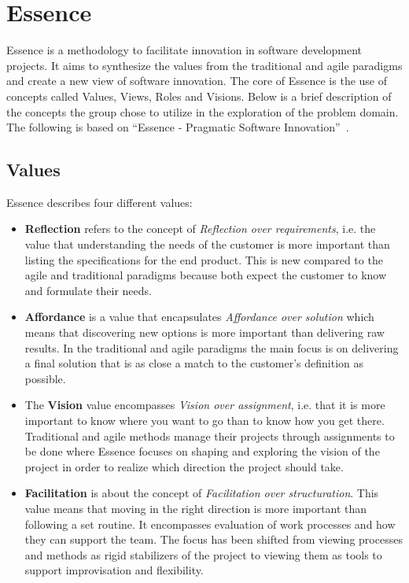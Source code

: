 \section{Essence}
Essence is a methodology to facilitate innovation in software development projects. It aims to synthesize the values from the traditional and agile para\-digms and create a new view of software innovation. The core of Essence is the use of concepts called Values, Views, Roles and Visions. Below is a brief description of the concepts the group chose to utilize in the exploration of the problem domain. The following is based on ``Essence - Pragmatic Software Innovation''~\cite{essence}.

\subsection{Values} 
Essence describes four different values: 
\begin{itemize}
\item \textbf{Reflection} refers to the concept of \textit{Reflection over requirements}, i.e. the value that understanding the needs of the customer is more important than listing the specifications for the end product. This is new compared to the agile and traditional paradigms because both expect the customer to know and formulate their needs.  
\item \textbf{Affordance} is a value that encapsulates \textit{Affordance over solution} which means that discovering new options is more important than delivering raw results. In the traditional and agile paradigms the main focus is on delivering a final solution that is as close a match to the customer's definition as possible. 
\item The \textbf{Vision} value encompasses \textit{Vision over assignment}, i.e. that it is more important to know where you want to go than to know how you get there. Traditional and agile methods manage their projects through assignments to be done where Essence focuses on shaping and exploring the vision of the project in order to realize which direction the project should take.
\item \textbf{Facilitation} is about the concept of \textit{Facilitation over structuration}. This value means that moving in the right direction is more important than following a set routine. It encompasses evaluation of work processes and how they can support the team. The focus has been shifted from viewing processes and methods as rigid stabilizers of the project to viewing them as tools to support improvisation and flexibility.
\end{itemize}

